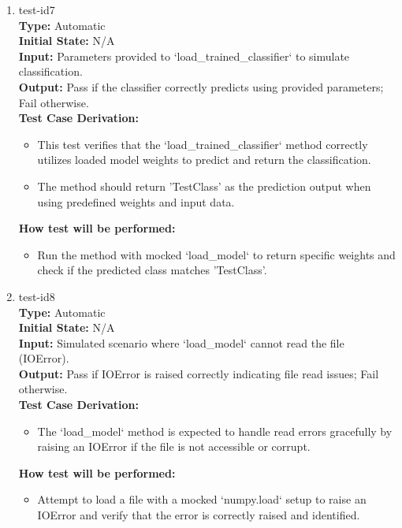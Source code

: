 \documentclass[12pt, titlepage]{article}
\begin{document}
\begin{enumerate}
  \item{test-id7\\}
  \textbf{Type:} Automatic\\
  \textbf{Initial State:} N/A\\
  \textbf{Input:} Parameters provided to `load\_trained\_classifier` to
   simulate classification.\\
  \textbf{Output:} Pass if the classifier correctly predicts using provided 
  parameters; Fail otherwise.\\
  \textbf{Test Case Derivation:}
  \begin{itemize}
      \item This test verifies that the `load\_trained\_classifier` method correctly 
      utilizes loaded model weights to predict and return the classification.
      \item The method should return 'TestClass' as the prediction output when 
      using predefined weights and input data.
  \end{itemize}
  \textbf{How test will be performed:}
  \begin{itemize}
      \item Run the method with mocked `load\_model` to return specific weights and 
      check if the predicted class matches 'TestClass'.
  \end{itemize}
  
  \item{test-id8\\}
  \textbf{Type:} Automatic\\
  \textbf{Initial State:} N/A\\
  \textbf{Input:} Simulated scenario where `load\_model` cannot read the file 
  (IOError).\\
  \textbf{Output:} Pass if IOError is raised correctly indicating file read 
  issues; Fail otherwise.\\
  \textbf{Test Case Derivation:}
  \begin{itemize}
      \item The `load\_model` method is expected to handle read errors gracefully by 
      raising an IOError if the file is not accessible or corrupt.
  \end{itemize}
  \textbf{How test will be performed:}
  \begin{itemize}
      \item Attempt to load a file with a mocked `numpy.load` setup to raise an 
      IOError and verify that the error is correctly raised and identified.
  \end{itemize}
  

\end{enumerate}
\end{document}
